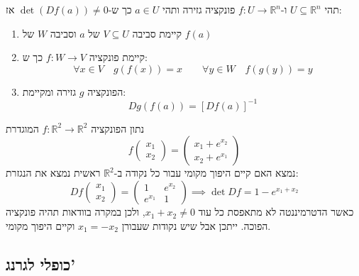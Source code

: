 \documentclass{tstextbook}
\begin{document}
\begin{theorem}
תהי \(U\subseteq \mathbb{R}^n\) ו-\(f:U\to\mathbb{R}^n\) פונקציה גזירה ותהי \(a\in U\) כך ש-\(\det(Df(a))\neq 0\) אז:

  \begin{enumerate}
    \item קיימת סביבה \(V\subseteq U\) של \(a\) וסביבה \(W\) של \(f(a)\)


    \item קיימת פונקציה \(f:W\to V\) כך ש: 
$$\forall x \in V\quad g(f(x))=x\qquad \forall y\in W\quad f(g(y))=y$$


    \item הפונקציה \(g\) גזירה ומקיימת: 
$$Dg(f(a))=[Df(a)]^{-1}$$


  \end{enumerate}
\end{theorem}
\begin{example}
נתון הפונקציה \(f:\mathbb{R}^2\to\mathbb{R}^2\) המוגדרת 
$$f\begin{pmatrix}x_{1}\\x_{2}\end{pmatrix}=\begin{pmatrix}x_{1}+e^{x_{2}} \\x_{2}+e^{x_{1}}
\end{pmatrix}$$
נמצא האם קיים היפוך מקומי עבור כל נקודה ב-\(\mathbb{R}^2\)
ראשית נמצא את הנגזרת:
$$Df\begin{pmatrix}x_{1}\\ x_{2}\end{pmatrix}=\begin{pmatrix}1 & e^{x_{2}} \\e^{x_{1}} & 1
\end{pmatrix}\implies \det Df=1-e^{x_{1}+x_{2}}$$
כאשר הדטרמיננטה לא מתאפסת כל עוד \(x_{1}+x_{2}\neq 0\), ולכן במקרה בוודאות תהיה פונקציה הפוכה. ייתכן אבל שיש נקודות שעבורן \(x_{1}=-x_{2}\) וקיים היפוך מקומי.

\end{example}
\subsection{כופלי לגרנג'}
\end{document}
